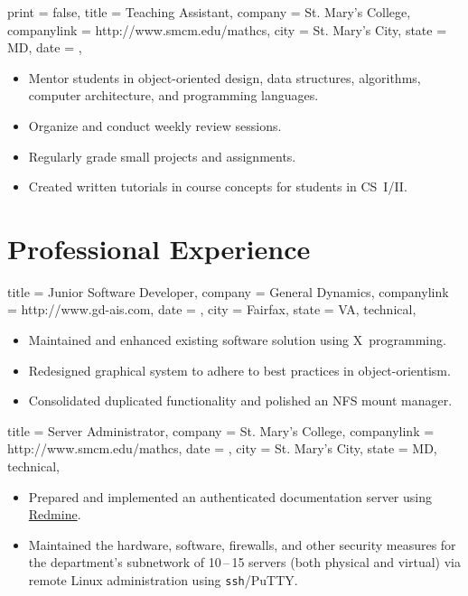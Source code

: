\documentclass{simplecv}
\begin{document}
\begin{position}
  {
    print   = false,
    title   = Teaching Assistant,
    company = St. Mary's College,
    companylink = http://www.smcm.edu/mathcs,
    city    = St. Mary's City,
    state   = MD,
    date    = ,
  }

\begin{itemize}
\item Mentor students in object-oriented design, data structures, algorithms, computer architecture, and programming languages.
\item Organize and conduct weekly review sessions.
\item Regularly grade small projects and assignments.
\item Created written tutorials in course concepts for students in CS~I\slash II.
\end{itemize}
\end{position}

\vfill
\section{Professional Experience}

\begin{position}
  {
    title   = Junior Software Developer,
    company = General Dynamics,
    companylink = http://www.gd-ais.com,
    date    = ,
    city    = Fairfax,
    state   = VA,
    technical,
  }

\begin{itemize}
\item Maintained and enhanced existing software solution using X~programming.
\item Redesigned graphical system to adhere to best practices in object-orientism.
\item Consolidated duplicated functionality and polished an NFS mount manager.
\end{itemize}
\end{position}

\begin{position}
  {
    title   = Server Administrator,
    company = St. Mary's College,
    companylink = http://www.smcm.edu/mathcs,
    date    = ,
    city    = St. Mary's City,
    state   = MD,
    technical,
  }

\begin{itemize}
\item Prepared and implemented an authenticated documentation server using \href{http://www.redmine.org}{Redmine}.
\item Maintained the hardware, software, firewalls, and other security measures
  for the department's subnetwork of 10\,--\,15 servers (both physical and virtual) via remote Linux administration using \texttt{ssh}\slash PuTTY.
\end{itemize}
\end{position}
\end{document}
